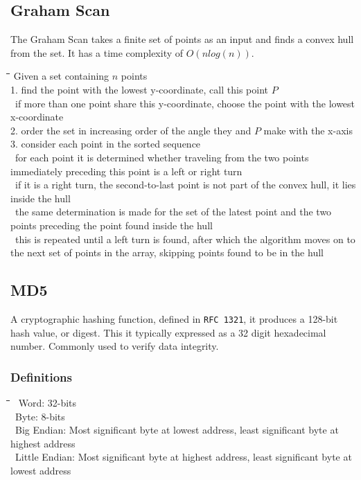 \documentclass[10pt,letterpaper]{scrartcl}
\newcommand{\tbul}{\textbullet}
\newcommand{\tend}{\>\textendash}
\newcommand{\tasc}{\>\>\textasteriskcentered}
\newcommand{\tabDef}{\hspace{2em}\=\hspace{2em}\=\hspace{2em}\=\hspace{2em}\=\kill}
\begin{document}
\subsection{Graham Scan}
The Graham Scan takes a finite set of points as an input and finds a convex hull from the set. It has a time complexity of $O(nlog(n))$. 
\begin{tabbing}\tabDef
Given a set containing $n$ points \\
1. find the point with the lowest y-coordinate, call this point $P$ \\
    \tend\ if more than one point share this y-coordinate, choose the point with the lowest x-coordinate \\
2. order the set in increasing order of the angle they and $P$ make with the x-axis \\
3. consider each point in the sorted sequence \\
    \tend\ for each point it is determined whether traveling from the two points immediately preceding this point is a left or right turn \\
        \tasc\ if it is a right turn, the second-to-last point is not part of the convex hull, it lies inside the hull \\
        \tasc\ the same determination is made for the set of the latest point and the two points preceding the point found inside the hull\\
        \tasc\ this is repeated until a left turn is found, after which the algorithm moves on to the next set of points in the array, skipping points found to be in the hull \\
\end{tabbing}

\subsection{MD5}
A cryptographic hashing function, defined in \texttt{RFC 1321}, it produces a 128-bit hash value, or digest. This it typically expressed as a 32 digit hexadecimal number. Commonly used to verify data integrity.
\subsubsection*{Definitions}
\begin{tabbing}\tabDef
\tbul\ Word: 32-bits \\
\tbul\ Byte: 8-bits \\
\tbul\ Big Endian: Most significant byte at lowest address, least significant byte at highest address \\
\tbul\ Little Endian: Most significant byte at highest address, least significant byte at lowest address
\end{tabbing}
\end{document}
